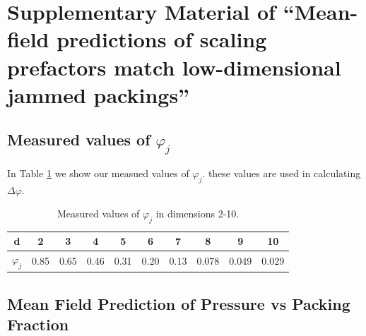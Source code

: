 
\section{Supplementary Material of ``Mean-field predictions of scaling prefactors match low-dimensional jammed packings''}
\author{James D Sartor, Sean A. Ridout, Eric I. Corwin}

\label{excessContactsScalingSupplement}

\subsection{Measured values of $\varphi_j$}
In Table \ref{table:phij} we show our measued values of $\varphi_j$. these values are used in calculating $\Delta \varphi$.

\begin{table}[ht]
\centering
\caption{Measured values of $\varphi_j$ in dimensions 2-10.
\label{table:phij}}
\begin{tabular}{ |c|c|c|c|c|c|c|c|c|c| } 
 \hline
 d & 2 & 3 & 4 & 5 & 6 & 7 & 8 & 9 & 10 \\ 
 \hline
 $\varphi_j$ & 0.85 & 0.65 & 0.46 & 0.31 & 0.20 & 0.13 & 0.078 & 0.049 & 0.029\\ 
 \hline
\end{tabular}
\end{table}

\subsection{Mean Field Prediction of Pressure vs Packing Fraction}


